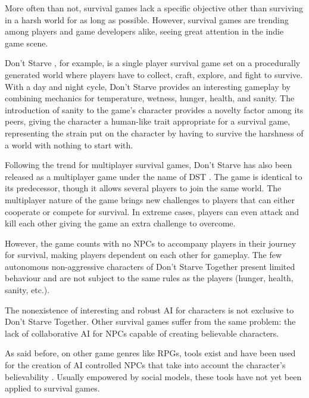 More often than not, survival games lack a specific objective other than surviving in a harsh world for as long as possible.
However, survival games are trending among players and game developers alike, seeing great attention in the indie game scene.

Don't Starve \cite{games:dontstarve}, for example, is a single player survival game set on a procedurally generated world where players have to collect, craft, explore, and fight to survive.
With a day and night cycle, Don't Starve provides an interesting gameplay by combining mechanics for temperature, wetness, hunger, health, and sanity.
The introduction of sanity to the game's character provides a novelty factor among its peers, giving the character a human-like trait appropriate for a survival game, representing the strain put on the character by having to survive the harshness of a world with nothing to start with.

Following the trend for multiplayer survival games, Don't Starve has also been released as a multiplayer game under the name of \ac{DST} \cite{games:dontstarvetogether}.
The game is identical to its predecessor, though it allows several players to join the same world.
The multiplayer nature of the game brings new challenges to players that can either cooperate or compete for survival.
In extreme cases, players can even attack and kill each other giving the game an extra challenge to overcome.

However, the game counts with no \acp{NPC} to accompany players in their journey for survival, making players dependent on each other for gameplay.
The few autonomous non-aggressive characters of Don't Starve Together present limited behaviour and are not subject to the same rules as the players (hunger, health, sanity, etc.).

The nonexistence of interesting and robust \ac{AI} for characters is not exclusive to Don't Starve Together.
Other survival games suffer from the same problem: the lack of collaborative \ac{AI} for \acp{NPC} capable of creating believable characters.

As said before, on other game genres like \acp{RPG}, tools exist and have been used for the creation of \ac{AI} controlled \acp{NPC} that take into account the character's believability \cite{guimaraes:cif-ck}\cite{afonso:agents-that-relate}\cite{ferreira:merchant-model}.
Usually empowered by social models, these tools have not yet been applied to survival games.

